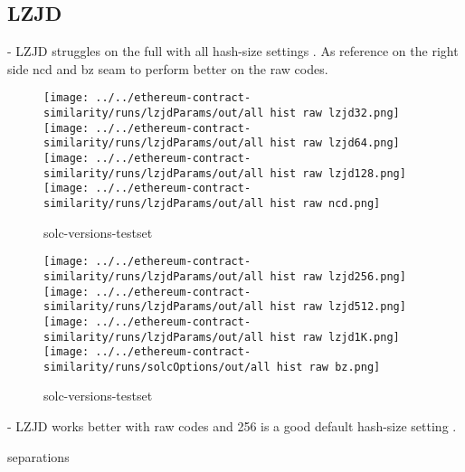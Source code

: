\documentclass[../main.tex]{subfiles}
\begin{document}
\subsection{LZJD}

\hyp{
  LZJD struggles on the full  with all hash-size settings  . As reference on the right side ncd and bz seam to perform better on the raw codes.
}

\begin{figure}[ht!]
  \centering
  \texttt{[image: ../../ethereum-contract-similarity/runs/lzjdParams/out/all hist raw lzjd32.png]}%
  \texttt{[image: ../../ethereum-contract-similarity/runs/lzjdParams/out/all hist raw lzjd64.png]}%
  \texttt{[image: ../../ethereum-contract-similarity/runs/lzjdParams/out/all hist raw lzjd128.png]}%
  \texttt{[image: ../../ethereum-contract-similarity/runs/lzjdParams/out/all hist raw ncd.png]}%
  \caption{solc-versions-testset}
  \label{fig:solc_lzjd1}
\end{figure}

\begin{figure}[ht!]
  \centering
  \texttt{[image: ../../ethereum-contract-similarity/runs/lzjdParams/out/all hist raw lzjd256.png]}%
  \texttt{[image: ../../ethereum-contract-similarity/runs/lzjdParams/out/all hist raw lzjd512.png]}%
  \texttt{[image: ../../ethereum-contract-similarity/runs/lzjdParams/out/all hist raw lzjd1K.png]}%
  \texttt{[image: ../../ethereum-contract-similarity/runs/solcOptions/out/all hist raw bz.png]}%
  \caption{solc-versions-testset}
  \label{fig:solc_lzjd2}
\end{figure}

\hyp{
  LZJD works better with raw codes and 256 is a good default hash-size setting .
}

\begin{table}[ht!]
  \centering
  \caption{separations}
  \label{tbl:lz_sep}
\end{table}
\end{document}

